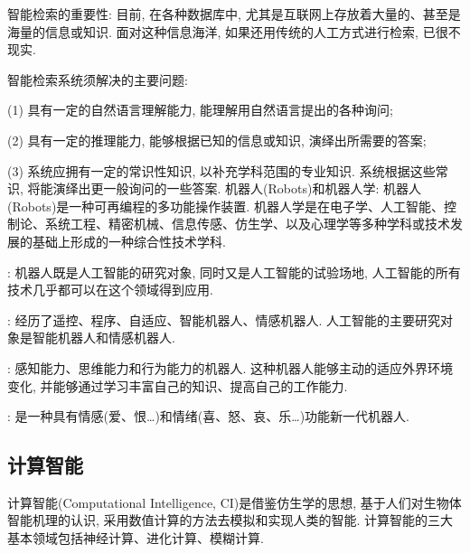 智能检索的重要性: 目前, 在各种数据库中, 尤其是互联网上存放着大量的、甚至是海量的信息或知识. 面对这种信息海洋, 如果还用传统的人工方式进行检索, 已很不现实.

智能检索系统须解决的主要问题:

(1) 具有一定的自然语言理解能力, 能理解用自然语言提出的各种询问;

(2) 具有一定的推理能力, 能够根据已知的信息或知识, 演绎出所需要的答案;

(3) 系统应拥有一定的常识性知识, 以补充学科范围的专业知识. 系统根据这些常识, 将能演绎出更一般询问的一些答案.
机器人(Robots)和机器人学: 机器人(Robots)是一种可再编程的多功能操作装置. 机器人学是在电子学、人工智能、控制论、系统工程、精密机械、信息传感、仿生学、以及心理学等多种学科或技术发展的基础上形成的一种综合性技术学科.

: 机器人既是人工智能的研究对象, 同时又是人工智能的试验场地, 人工智能的所有技术几乎都可以在这个领域得到应用.

:  经历了遥控、程序、自适应、智能机器人、情感机器人. 人工智能的主要研究对象是智能机器人和情感机器人.

: 感知能力、思维能力和行为能力的机器人. 这种机器人能够主动的适应外界环境变化, 并能够通过学习丰富自己的知识、提高自己的工作能力.

: 是一种具有情感(爱、恨…)和情绪(喜、怒、哀、乐…)功能新一代机器人.
\subsection{计算智能}
计算智能(Computational Intelligence, CI)是借鉴仿生学的思想, 基于人们对生物体智能机理的认识, 采用数值计算的方法去模拟和实现人类的智能. 计算智能的三大基本领域包括神经计算、进化计算、模糊计算.
